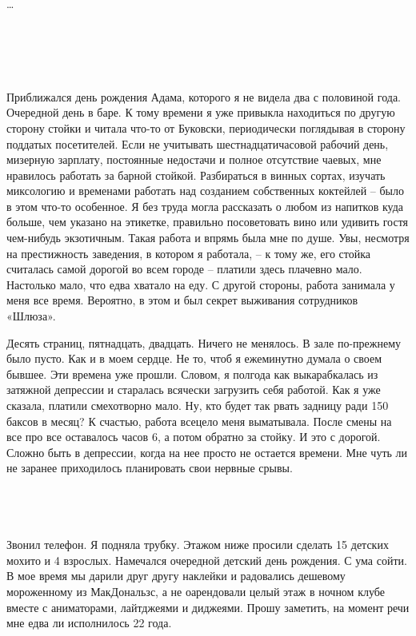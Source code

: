\documentclass[
]{book}
\begin{document}
\ldots{}

\hypertarget{section-1}{%
\chapter{~}\label{section-1}}

Приближался день рождения Адама, которого я не видела два с половиной года. Очередной день в баре. К тому времени я уже привыкла находиться по другую сторону стойки и читала что-то от Буковски, периодически поглядывая в сторону поддатых посетителей. Если не учитывать шестнадцатичасовой рабочий день, мизерную зарплату, постоянные недостачи и полное отсутствие чаевых, мне нравилось работать за барной стойкой. Разбираться в винных сортах, изучать миксологию и временами работать над созданием собственных коктейлей -- было в этом что-то особенное. Я без труда могла рассказать о любом из напитков куда больше, чем указано на этикетке, правильно посоветовать вино или удивить гостя чем-нибудь экзотичным. Такая работа и впрямь была мне по душе. Увы, несмотря на престижность заведения, в котором я работала, -- к тому же, его стойка считалась самой дорогой во всем городе -- платили здесь плачевно мало. Настолько мало, что едва хватало на еду. С другой стороны, работа занимала у меня все время. Вероятно, в этом и был секрет выживания сотрудников «Шлюза».

Десять страниц, пятнадцать, двадцать. Ничего не менялось. В зале по-прежнему было пусто. Как и в моем сердце. Не то, чтоб я ежеминутно думала о своем бывшее. Эти времена уже прошли. Словом, я полгода как выкарабкалась из затяжной депрессии и старалась всячески загрузить себя работой. Как я уже сказала, платили смехотворно мало. Ну, кто будет так рвать задницу ради 150 баксов в месяц? К счастью, работа всецело меня выматывала. После смены на все про все оставалось часов 6, а потом обратно за стойку. И это с дорогой. Сложно быть в депрессии, когда на нее просто не остается времени. Мне чуть ли не заранее приходилось планировать свои нервные срывы.

\hypertarget{section-2}{%
\section{~}\label{section-2}}

Звонил телефон. Я подняла трубку. Этажом ниже просили сделать 15 детских мохито и 4 взрослых. Намечался очередной детский день рождения. С ума сойти. В мое время мы дарили друг другу наклейки и радовались дешевому мороженному из МакДональзс, а не оарендовали целый этаж в ночном клубе вместе с аниматорами, лайтджеями и диджеями. Прошу заметить, на момент речи мне едва ли исполнилось 22 года.
\end{document}

